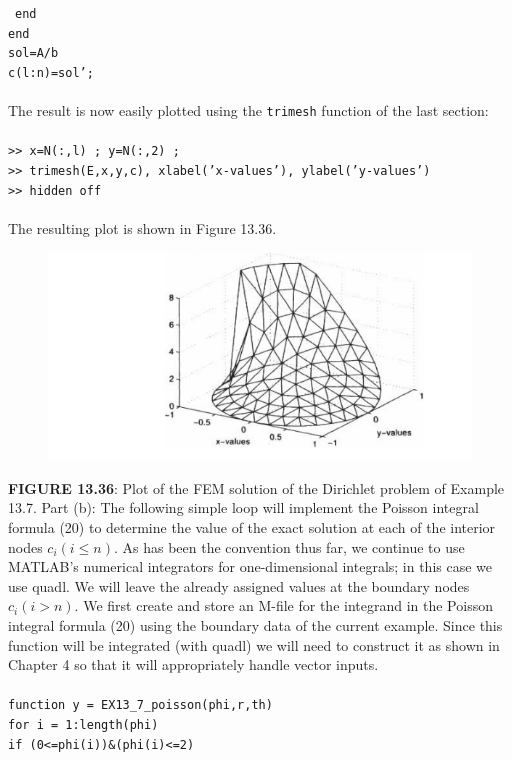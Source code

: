 \documentclass[../main.tex]{subfiles}
\begin{document}
~\texttt{end}\\
\texttt{end}\\
\texttt{sol=A/b }\\
\texttt{c(l:n)=sol';}\\
\\
The result is now easily plotted using the \texttt{trimesh} function of the last section: 
\\
\\
\texttt{>> x=N(:,l) ; y=N(:,2) ;}\\
\texttt{>> trimesh(E,x,y,c), xlabel('x-values'), ylabel('y-values') 
}\\
\texttt{>> hidden off 
}\\
\\
The resulting plot is shown in Figure 13.36.
\begin{figure}[H]
\includegraphics[width=0.9\linewidth]{22}
	\centering
	\label{pfig:ch13_22}
\end{figure}
\textbf{FIGURE 13.36}: Plot of the FEM solution of the Dirichlet problem of Example 13.7.
Part (b): The following simple loop will implement the Poisson integral formula (20) to determine the value of the exact solution at each of the interior nodes $c_{i}(i \leq n)$. As has been the convention thus far, we continue to use MATLAB's numerical integrators for one-dimensional integrals; in this case we use quadl. We will leave the already assigned values at the boundary nodes $c_{i}(i>n)$. We first create and store an M-file for the integrand in the Poisson integral formula (20) using the boundary data of the current example. Since this function will be integrated (with quadl) we will need to construct it as shown in Chapter 4 so that it will appropriately handle vector inputs.
\\
\\
\texttt{function y = EX13\_7\_poisson(phi,r,th) }\\
\texttt{for i = 1:length(phi)}\\
\texttt{if (0<=phi(i))\&(phi(i)<=2)}
\end{document}
